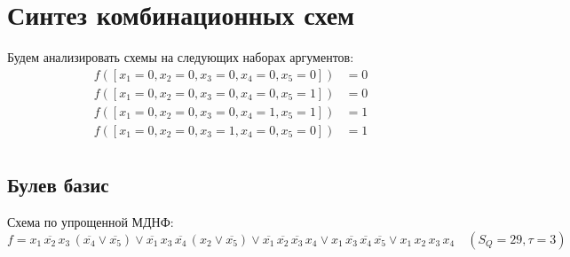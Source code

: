\documentclass{article}
\begin{document}
\section*{Синтез комбинационных схем}
Будем анализировать схемы на следующих наборах аргументов:
\begin{align*}
    f([x_1 = 0, x_2 = 0, x_3 = 0, x_4 = 0, x_5 = 0]) &= 0 \\
    f([x_1 = 0, x_2 = 0, x_3 = 0, x_4 = 0, x_5 = 1]) &= 0 \\
    f([x_1 = 0, x_2 = 0, x_3 = 0, x_4 = 1, x_5 = 1]) &= 1 \\
    f([x_1 = 0, x_2 = 0, x_3 = 1, x_4 = 0, x_5 = 0]) &= 1 \\
\end{align*}
\newpage
\subsection*{Булев базис}
Схема по упрощенной МДНФ:
\[f = x_{1} \, \overline{x_{2}} \, x_{3} \, \left(\overline{x_{4}} \lor \overline{x_{5}}\right) \lor \overline{x_{1}} \, x_{3} \, \overline{x_{4}} \, \left(x_{2} \lor \overline{x_{5}}\right) \lor \overline{x_{1}} \, \overline{x_{2}} \, \overline{x_{3}} \, x_{4} \lor x_{1} \, \overline{x_{3}} \, \overline{x_{4}} \, \overline{x_{5}} \lor x_{1} \, x_{2} \, x_{3} \, x_{4}\quad(S_Q = 29, \tau = 3)\]
\end{document}

